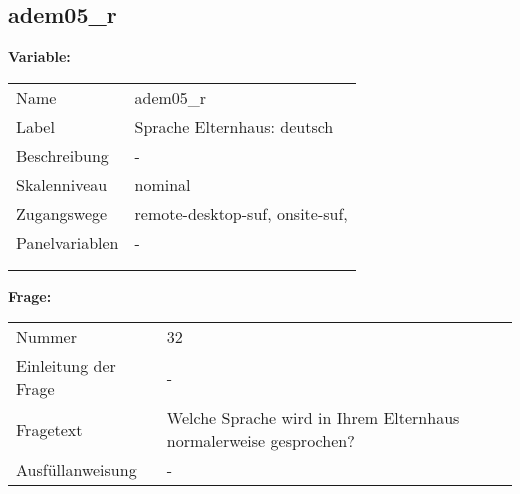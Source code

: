 	
	
	\subsection{adem05\_r}
	\label{subSection:adem05_r}

	\noindent\textbf{Variable:}\\
		\begin{tabular}{lL{11.3cm}}
			\label{tableVariable:adem05_r}
			Name & adem05\_r \\
			Label & Sprache Elternhaus: deutsch \\
			Beschreibung & - \\
			Skalenniveau & nominal \\
			Zugangswege &
				remote-desktop-suf,
				onsite-suf,
 \\
			Panelvariablen & -
			 \\
			 \\
 \\
		\end{tabular}

		\vspace*{1 cm}
		\noindent\textbf{Frage:}\\
		\begin{tabular}{lL{11.3cm}}
			\label{tableQuestion:adem05_r}
			Nummer & 32 \\
			Einleitung der Frage & - \\
			Fragetext & Welche Sprache wird in Ihrem Elternhaus normalerweise gesprochen? \\
			Ausfüllanweisung & - \\
		\end{tabular}





